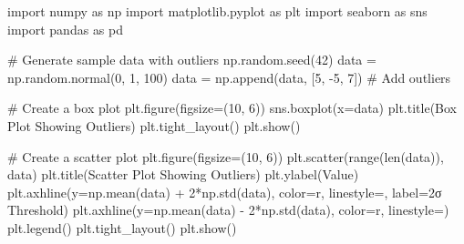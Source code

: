 \documentclass[
  letterpaper,
  DIV=11,
  numbers=noendperiod]{scrreprt}
\newenvironment{Shaded}{\begin{snugshade}}{\end{snugshade}}
\newcommand{\BuiltInTok}[1]{\textcolor[rgb]{0.00,0.23,0.31}{#1}}
\newcommand{\CommentTok}[1]{\textcolor[rgb]{0.37,0.37,0.37}{#1}}
\newcommand{\DecValTok}[1]{\textcolor[rgb]{0.68,0.00,0.00}{#1}}
\newcommand{\ImportTok}[1]{\textcolor[rgb]{0.00,0.46,0.62}{#1}}
\newcommand{\NormalTok}[1]{\textcolor[rgb]{0.00,0.23,0.31}{#1}}
\newcommand{\OperatorTok}[1]{\textcolor[rgb]{0.37,0.37,0.37}{#1}}
\newcommand{\StringTok}[1]{\textcolor[rgb]{0.13,0.47,0.30}{#1}}
\begin{document}
\begin{Shaded}
\begin{Highlighting}[]
\ImportTok{import}\NormalTok{ numpy }\ImportTok{as}\NormalTok{ np}
\ImportTok{import}\NormalTok{ matplotlib.pyplot }\ImportTok{as}\NormalTok{ plt}
\ImportTok{import}\NormalTok{ seaborn }\ImportTok{as}\NormalTok{ sns}
\ImportTok{import}\NormalTok{ pandas }\ImportTok{as}\NormalTok{ pd}

\CommentTok{\# Generate sample data with outliers}
\NormalTok{np.random.seed(}\DecValTok{42}\NormalTok{)}
\NormalTok{data }\OperatorTok{=}\NormalTok{ np.random.normal(}\DecValTok{0}\NormalTok{, }\DecValTok{1}\NormalTok{, }\DecValTok{100}\NormalTok{)}
\NormalTok{data }\OperatorTok{=}\NormalTok{ np.append(data, [}\DecValTok{5}\NormalTok{, }\OperatorTok{{-}}\DecValTok{5}\NormalTok{, }\DecValTok{7}\NormalTok{])  }\CommentTok{\# Add outliers}

\CommentTok{\# Create a box plot}
\NormalTok{plt.figure(figsize}\OperatorTok{=}\NormalTok{(}\DecValTok{10}\NormalTok{, }\DecValTok{6}\NormalTok{))}
\NormalTok{sns.boxplot(x}\OperatorTok{=}\NormalTok{data)}
\NormalTok{plt.title(}\StringTok{\textquotesingle{}Box Plot Showing Outliers\textquotesingle{}}\NormalTok{)}
\NormalTok{plt.tight\_layout()}
\NormalTok{plt.show()}

\CommentTok{\# Create a scatter plot}
\NormalTok{plt.figure(figsize}\OperatorTok{=}\NormalTok{(}\DecValTok{10}\NormalTok{, }\DecValTok{6}\NormalTok{))}
\NormalTok{plt.scatter(}\BuiltInTok{range}\NormalTok{(}\BuiltInTok{len}\NormalTok{(data)), data)}
\NormalTok{plt.title(}\StringTok{\textquotesingle{}Scatter Plot Showing Outliers\textquotesingle{}}\NormalTok{)}
\NormalTok{plt.ylabel(}\StringTok{\textquotesingle{}Value\textquotesingle{}}\NormalTok{)}
\NormalTok{plt.axhline(y}\OperatorTok{=}\NormalTok{np.mean(data) }\OperatorTok{+} \DecValTok{2}\OperatorTok{*}\NormalTok{np.std(data), color}\OperatorTok{=}\StringTok{\textquotesingle{}r\textquotesingle{}}\NormalTok{, linestyle}\OperatorTok{=}\StringTok{\textquotesingle{}{-}{-}\textquotesingle{}}\NormalTok{, label}\OperatorTok{=}\StringTok{\textquotesingle{}2σ Threshold\textquotesingle{}}\NormalTok{)}
\NormalTok{plt.axhline(y}\OperatorTok{=}\NormalTok{np.mean(data) }\OperatorTok{{-}} \DecValTok{2}\OperatorTok{*}\NormalTok{np.std(data), color}\OperatorTok{=}\StringTok{\textquotesingle{}r\textquotesingle{}}\NormalTok{, linestyle}\OperatorTok{=}\StringTok{\textquotesingle{}{-}{-}\textquotesingle{}}\NormalTok{)}
\NormalTok{plt.legend()}
\NormalTok{plt.tight\_layout()}
\NormalTok{plt.show()}
\end{Highlighting}
\end{Shaded}
\end{document}

